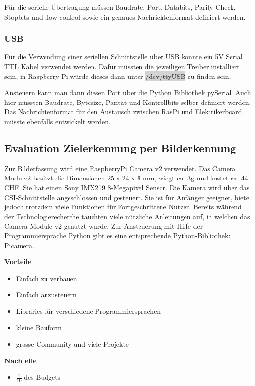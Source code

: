\documentclass[a4paper]{report}
\begin{document}
Für die serielle Übertragung müssen Baudrate, Port, Databits, Parity Check, Stopbits und flow control sowie ein genaues Nachrichtenformat definiert werden.

\subsubsection{USB}

Für die Verwendung einer seriellen Schnittstelle über USB könnte ein 5V Serial TTL Kabel verwendet werden. Dafür müssten die jeweiligen Treiber installiert sein, in Raspberry Pi würde dieses dann unter \colorbox{lightgrey}{/dev/ttyUSB} zu finden sein.

Ansteuern kann man dann diesen Port über die Python Bibliothek pySerial. \parencite{Liechti2017} Auch hier müssten Baudrate, Bytesize, Parität und Kontrollbits selber definiert werden. Das Nachrichtenformat für den Austausch zwischen RasPi und Elektrikerboard müsste ebenfalls entwickelt werden.

\subsection{Evaluation Zielerkennung per Bilderkennung}

Zur Bilderfassung wird eine RaspberryPi Camera v2 verwendet. Das Camera Modulv2 besitzt die Dimensionen 25 x 24 x 9 mm, wiegt ca. 3g und kostet ca. 44 CHF.
Sie hat einen Sony IMX219 8-Megapixel Sensor. Die Kamera wird über das CSI-Schnittstelle angeschlossen und gesteuert. Sie ist für Anfänger geeignet, biete jedoch trotzdem viele Funktionen für Fortgeschrittene Nutzer.
Bereits während der Technologierecherche tauchten viele nützliche Anleitungen auf, in welchen das Camera Module v2 genutzt wurde.
Zur Ansteuerung mit Hilfe der Programmiersprache Python gibt es eine entsprechende Python-Bibliothek: Picamera.

\begin{multicols}{2}
	\textbf{Vorteile}
	\begin{itemize}[label={+},noitemsep]
		\item Einfach zu verbauen
		\item Einfach anzusteuern
		\item Libraries für verschiedene Programmiersprachen
		\item kleine Bauform
		\item grosse Community und viele Projekte
	\end{itemize}
	\columnbreak
	\textbf{Nachteile}
	\begin{itemize}[label={-},noitemsep]
		\item $\frac{1}{10}$ des Budgets
	\end{itemize}
\end{multicols}
\end{document}

